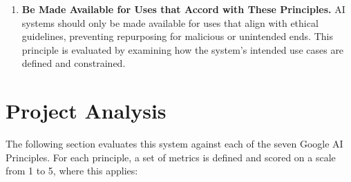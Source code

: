 \begin{enumerate}
    \item \textbf{Be Made Available for Uses that Accord with These Principles.} AI systems should only be made available for uses that align with ethical guidelines, preventing repurposing for malicious or unintended ends. This principle is evaluated by examining how the system's intended use cases are defined and constrained.

\end{enumerate}

\section{Project Analysis}

The following section evaluates this system against each of the seven Google AI Principles. For each principle, a set of metrics is defined and scored on a scale from 1 to 5, where this applies:

\begin{table}[h]
\centering
{}
\caption{Scoring rubric for the ethical dimension evaluation.}
\end{table}

